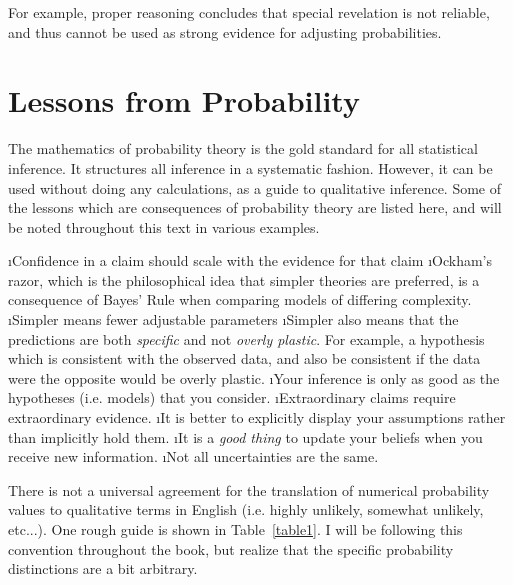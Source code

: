 For example, proper reasoning concludes that special revelation is not reliable, and thus cannot be used as strong evidence for adjusting probabilities.




\section{Lessons from Probability}
The mathematics of probability theory is the gold standard for all statistical inference.  It structures all inference in a systematic fashion.  However, it can be used without doing any calculations, as a guide to qualitative inference.  Some of the lessons which are consequences of probability theory are listed here, and will be noted throughout this text in various examples.

\bi
\i Confidence in a claim should scale with the evidence for that claim
\i Ockham's razor, which is the philosophical idea that simpler theories are preferred, is a consequence of Bayes' Rule when comparing models of differing complexity.
\i Simpler means fewer adjustable parameters
\i Simpler also means that the predictions are both {\em specific} and not {\em overly plastic}. For example, a hypothesis which is consistent with the observed data, and also be consistent if the data were the opposite would be overly plastic.
\i Your inference is only as good as the hypotheses (i.e. models) that you consider.
\i Extraordinary claims require extraordinary evidence.\cite{sagandemon}
\i It is better to explicitly display your assumptions rather than implicitly hold them.
\i It is a {\em good thing} to update your beliefs when you receive new information.
\i Not all uncertainties are the same.
\ei


There is not a universal agreement for the translation of numerical probability values to qualitative terms in English (i.e. highly unlikely, somewhat unlikely, etc...).  One rough guide is shown in Table~\ref{table1}.  I will be following this convention throughout the book, but realize that the specific probability distinctions are a bit arbitrary.



